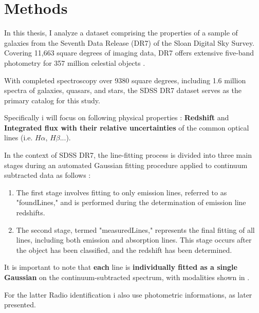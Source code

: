 \chapter{Methods}
In this thesis, I analyze a dataset comprising the properties of a sample of galaxies from the Seventh Data Release (DR7) of the Sloan Digital Sky Survey. Covering 11,663 square degrees of imaging data, DR7 offers extensive five-band photometry for 357 million celestial objects \cite{2009ApJS..182..543A,mpa-sdss-dr7}. 

With completed spectroscopy over 9380 square degrees, including 1.6 million spectra of galaxies, quasars, and stars, the SDSS DR7 dataset serves as the primary catalog for this study.
 
Specifically i will focus on following physical properties : \textbf{Redshift} and \textbf{Integrated flux with their relative uncertainties} of the common optical lines (i.e. $H\alpha$, $H\beta$...).

In the context of SDSS DR7, the line-fitting process is divided into three main stages during an automated Gaussian fitting procedure applied to continuum subtracted data as follows :
\begin{enumerate}
\item The first stage involves fitting to only emission lines, referred to as "foundLines," and is performed during the determination of emission line redshifts.

\item The second stage, termed "measuredLines," represents the final fitting of all lines, including both emission and absorption lines. This stage occurs after the object has been classified, and the redshift has been determined.
\end{enumerate}
It is important to note that \textbf{each} line is \textbf{individually fitted as a single Gaussian} on the continuum-subtracted spectrum, with modalities shown in \cite{1994ApJ...422..158O}.

For the latter Radio identification i also use photometric informations, as later presented.
 
